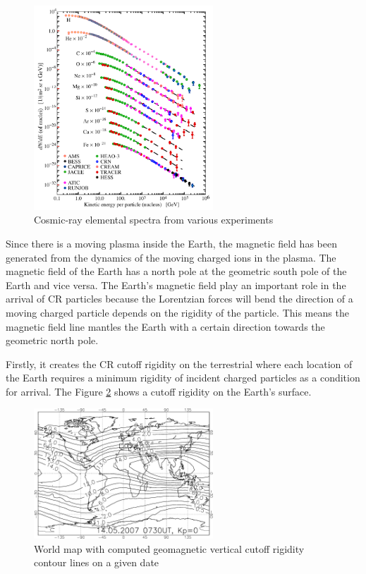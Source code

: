 \begin{figure}[h!]
    \centering
    \includegraphics[width=0.6\textwidth]{content/literature_review/figures/cr_composition.png}
    \caption{Cosmic-ray elemental spectra from various experiments \citep{review_particle_physics2012}}
    \label{fig:cr_composition}
\end{figure}


Since there is a moving plasma inside the Earth, the magnetic field 
has been generated from the dynamics of the moving charged ions in 
the plasma. The magnetic field of the Earth has a north pole at 
the geometric south pole of the Earth and vice versa. 
The Earth's magnetic field play
an important role in the arrival of CR particles because the Lorentzian 
forces will bend the direction of a moving charged particle depends 
on the rigidity of the particle.
This means the magnetic field line mantles the Earth with a
certain direction towards the geometric north pole.

Firstly, it creates the CR cutoff rigidity on the terrestrial
where each location of the Earth requires a minimum rigidity of incident charged particles as a condition for arrival. The 
Figure \ref{fig:cr_map_rigidity} shows a cutoff rigidity on the Earth's surface.

\begin{figure}[h!]
    \centering
    \includegraphics[width=0.6\textwidth]{content/literature_review/figures/map_cutoff_rigidity.png}
    \caption{ World map with computed geomagnetic vertical cutoff
        rigidity contour lines on a given date
        \citep{map_cr_rigidity_cutoff}
    }
    \label{fig:cr_map_rigidity}
\end{figure}

